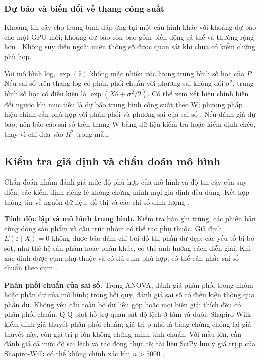 \subsubsection{Dự báo và biến đổi về thang công suất}

Khoảng tin cậy cho trung bình đáp ứng tại một cấu hình khác với khoảng dự báo cho một GPU mới; khoảng dự báo còn bao gồm biến động cá thể và thường rộng hơn \cite{ref19}. Không suy diễn ngoài miền thông số được quan sát khi chưa có kiểm chứng phù hợp.

Với mô hình log, \(\exp(\hat z)\) không mặc nhiên ước lượng trung bình số học của \(P\). Nếu sai số trên thang log có phân phối chuẩn với phương sai không đổi \(\sigma^2\), trung bình số học có điều kiện là \(\exp(X\theta+\sigma^2/2)\). Có thể xem xét hiệu chỉnh biến đổi ngược khi mục tiêu là dự báo trung bình công suất theo W; phương pháp hiệu chỉnh cần phù hợp với phân phối và phương sai của sai số \cite{ref14}. Nếu đánh giá dự báo, nên báo cáo sai số trên thang W bằng dữ liệu kiểm tra hoặc kiểm định chéo, thay vì chỉ dựa vào \(R^2\) trong mẫu.

\subsection{Kiểm tra giả định và chẩn đoán mô hình}

Chẩn đoán nhằm đánh giá mức độ phù hợp của mô hình và độ tin cậy của suy diễn; các kiểm định riêng lẻ không chứng minh mọi giả định đều đúng. Kết hợp thông tin về nguồn dữ liệu, đồ thị và các chỉ số định lượng \cite{ref15}.

\textbf{Tính độc lập và mô hình trung bình.} Kiểm tra bản ghi trùng, các phiên bản cùng dòng sản phẩm và cấu trúc nhóm có thể tạo phụ thuộc. Giả định \(E(\varepsilon\mid X)=0\) không được bảo đảm chỉ bởi đồ thị phần dư đẹp; các yếu tố bị bỏ sót, như thế hệ sản phẩm hoặc phân khúc, có thể ảnh hưởng cách diễn giải. Khi xác định được cụm phụ thuộc và có đủ cụm phù hợp, có thể cân nhắc sai số chuẩn theo cụm \cite{ref18}.

\textbf{Phân phối chuẩn của sai số.} Trong ANOVA, đánh giá phân phối trong nhóm hoặc phần dư của mô hình; trong hồi quy, đánh giá sai số có điều kiện thông qua phần dư. Không yêu cầu toàn bộ dữ liệu gộp hoặc mọi biến giải thích đều có phân phối chuẩn. Q-Q plot hỗ trợ quan sát độ lệch ở tâm và đuôi. Shapiro-Wilk kiểm định giả thuyết phân phối chuẩn; giá trị p nhỏ là bằng chứng chống lại giả thuyết này, còn giá trị p lớn không chứng minh tính chuẩn. Với mẫu lớn, cần đánh giá cả mức độ sai lệch và tác động thực tế; tài liệu SciPy lưu ý giá trị p của Shapiro-Wilk có thể không chính xác khi \(n>5000\) \cite{ref16}.

